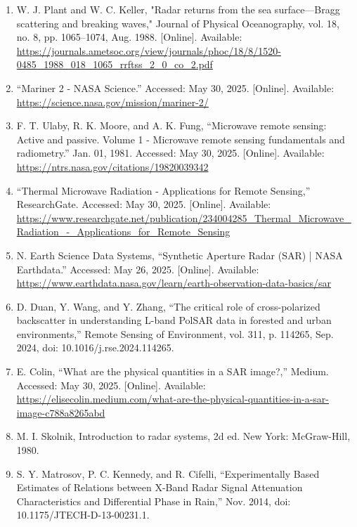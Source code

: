\documentclass{article}
\begin{document}
\begin{sloppypar}
\begin{enumerate}
    \item {W. J. Plant and W. C. Keller, "Radar returns from the sea surface—Bragg scattering and breaking waves," Journal of Physical Oceanography, vol. 18, no. 8, pp. 1065–1074, Aug. 1988. [Online]. Available: \url{https://journals.ametsoc.org/view/journals/phoc/18/8/1520-0485_1988_018_1065_rrftss_2_0_co_2.pdf}}

    \item{“Mariner 2 - NASA Science.” Accessed: May 30, 2025. [Online]. Available: \url{https://science.nasa.gov/mission/mariner-2/}}

    \item{F. T. Ulaby, R. K. Moore, and A. K. Fung, “Microwave remote sensing: Active and passive. Volume 1 - Microwave remote sensing fundamentals and radiometry.” Jan. 01, 1981. Accessed: May 30, 2025. [Online]. Available: \url{https://ntrs.nasa.gov/citations/19820039342}}

    \item{“Thermal Microwave Radiation - Applications for Remote Sensing,” ResearchGate. Accessed: May 30, 2025. [Online]. Available: \url{https://www.researchgate.net/publication/234004285_Thermal_Microwave_Radiation_-_Applications_for_Remote_Sensing}}

    \item{N. Earth Science Data Systems, “Synthetic Aperture Radar (SAR) | NASA Earthdata.” Accessed: May 26, 2025. [Online]. Available: \url{https://www.earthdata.nasa.gov/learn/earth-observation-data-basics/sar}}

    \item{D. Duan, Y. Wang, and Y. Zhang, “The critical role of cross-polarized backscatter in understanding L-band PolSAR data in forested and urban environments,” Remote Sensing of Environment, vol. 311, p. 114265, Sep. 2024, doi: 10.1016/j.rse.2024.114265.}

    \item{E. Colin, “What are the physical quantities in a SAR image?,” Medium. Accessed: May 30, 2025. [Online]. Available: \url{https://elisecolin.medium.com/what-are-the-physical-quantities-in-a-sar-image-c788a8265abd}}

    \item{M. I. Skolnik, Introduction to radar systems, 2d ed. New York: McGraw-Hill, 1980.}

    \item{S. Y. Matrosov, P. C. Kennedy, and R. Cifelli, “Experimentally Based Estimates of Relations between X-Band Radar Signal Attenuation Characteristics and Differential Phase in Rain,” Nov. 2014, doi: 10.1175/JTECH-D-13-00231.1.}


\end{enumerate}
\end{sloppypar}
\end{document}
